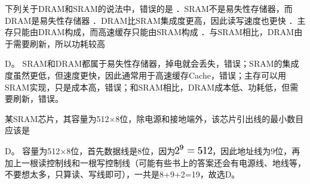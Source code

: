 \question 下列关于DRAM和SRAM的说法中，错误的是
．SRAM不是易失性存储器，而DRAM是易失性存储器
．DRAM比SRAM集成度更高，因此读写速度也更快
．主存只能由DRAM构成，而高速缓存只能由SRAM构成
．与SRAM相比，DRAM由于需要刷新，所以功耗较高
\par{}
\begin{solution}D。
SRAM和DRAM都属于易失性存储器，掉电就会丢失，错误；SRAM的集成度虽然更低，但速度更快，因此通常用于高速缓存Cache，错误；主存可以用SRAM实现，只是成本高，错误；和SRAM相比，DRAM成本低、功耗低，但需要刷新，错误。
\end{solution}
\question 某SRAM芯片，其容量为512×8位，除电源和接地端外，该芯片引出线的最小数目应该是
\par{}
\begin{solution}D。
容量为512×8位，首先数据线是8位，因为\includegraphics[width=0.64583in,height=0.16667in]{texmath/78dfcc5Cdpi7B3507D25E93D512}，因此地址线为9位，再加上一根读控制线和一根写控制线（可能有些书上的答案还会有电源线、地线等，不要想太多，只算读、写线即可），一共是8+9+2=19，故选D。
\end{solution}
